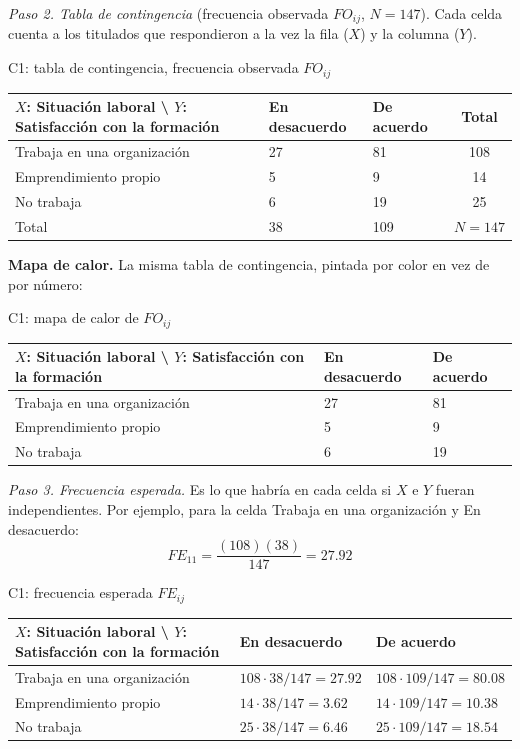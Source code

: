 \textit{Paso 2. Tabla de contingencia} (frecuencia observada $FO_{ij}$, $N = 147$). Cada celda cuenta a los titulados que respondieron a la vez la fila ($X$) y la columna ($Y$).

\begin{mitabla}{C1: tabla de contingencia, frecuencia observada $FO_{ij}$}
\begin{tabular}{L{3.8cm}C{3.00cm}C{3.00cm}|c}
\toprule
$X$: Situación laboral \textbackslash{} $Y$: Satisfacción con la formación & En desacuerdo & De acuerdo & Total \\
\midrule
Trabaja en una organización & 27 & 81 & 108 \\
Emprendimiento propio & 5 & 9 & 14 \\
No trabaja & 6 & 19 & 25 \\
\midrule
Total & 38 & 109 & $N = 147$ \\
\bottomrule
\end{tabular}
\end{mitabla}

\textbf{Mapa de calor.} La misma tabla de contingencia, pintada por color en vez de por número:

\begin{mitabla}{C1: mapa de calor de $FO_{ij}$}
\begin{tabular}{L{3.8cm}C{3.00cm}C{3.00cm}}
\toprule
$X$: Situación laboral \textbackslash{} $Y$: Satisfacción con la formación & En desacuerdo & De acuerdo \\
\midrule
Trabaja en una organización & 27 & 81 \\
Emprendimiento propio & 5 & 9 \\
No trabaja & 6 & 19 \\
\bottomrule
\end{tabular}
\end{mitabla}

\textit{Paso 3. Frecuencia esperada.} Es lo que habría en cada celda si $X$ e $Y$ fueran independientes. Por ejemplo, para la celda Trabaja en una organización y En desacuerdo:
\[
FE_{11} = \frac{(108)(38)}{147} = 27.92
\]

\begin{mitabla}{C1: frecuencia esperada $FE_{ij}$}
\begin{tabular}{L{3.8cm}C{3.00cm}C{3.00cm}}
\toprule
$X$: Situación laboral \textbackslash{} $Y$: Satisfacción con la formación & En desacuerdo & De acuerdo \\
\midrule
Trabaja en una organización & $108\cdot38/147 = 27.92$ & $108\cdot109/147 = 80.08$ \\
Emprendimiento propio & $14\cdot38/147 = 3.62$ & $14\cdot109/147 = 10.38$ \\
No trabaja & $25\cdot38/147 = 6.46$ & $25\cdot109/147 = 18.54$ \\
\bottomrule
\end{tabular}
\end{mitabla}

